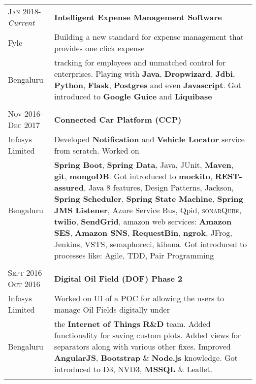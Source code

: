 \documentclass[a4paper,10pt]{article} %
\begin{document}
\begin{tabular}{l|p{11cm}}
\textsc{Jan 2018-}\emph{Current} & \textbf{Intelligent Expense Management Software}\\
Fyle & \footnotesize{Building a new standard for expense management that provides one click expense}\\
Bengaluru & \footnotesize{tracking for employees and unmatched control for enterprises. Playing with \textbf{Java}, \textbf{Dropwizard}, \textbf{Jdbi},  \textbf{Python}, \textbf{Flask}, \textbf{Postgres} and even \textbf{Javascript}.} Got introduced to \textbf{Google Guice} and \textbf{Liquibase}\\
\multicolumn{2}{c}{} \\

\textsc{Nov 2016-Dec 2017} & \textbf{Connected Car Platform (CCP)} \\
Infosys Limited & \footnotesize{Developed \textbf{Notification} and \textbf{Vehicle Locator} service from scratch. Worked on}\\ 
Bengaluru & \footnotesize{\textbf{Spring Boot}, \textbf{Spring Data}, Java, JUnit, \textbf{Maven}, \textbf{git}, \textbf{mongoDB}. Got introduced to \textbf{mockito}, \textbf{REST-assured}, Java 8 features, Design Patterns, Jackson, \textbf{Spring Scheduler}, \textbf{Spring State Machine}, \textbf{Spring JMS Listener}, Azure Service Bus, Qpid, \textsc{sonar}Q\textsc{ube}, \textbf{twilio}, \textbf{SendGrid}, amazon web services: \textbf{Amazon SES}, \textbf{Amazon SNS}, \textbf{RequestBin}, \textbf{ngrok}, JFrog, Jenkins, VSTS, semaphoreci, kibana. Got introduced to processes like: Agile, TDD, Pair Programming}\\
\multicolumn{2}{c}{} \\


\textsc{Sept 2016-Oct 2016} & \textbf{Digital Oil Field (DOF) Phase 2}\emph{}\\
Infosys Limited & \footnotesize{Worked on UI of a POC for allowing the users to manage Oil Fields digitally under}\\
Bengaluru & \footnotesize{the \textbf{Internet of Things} \textbf{R\&D} team. Added functionality for saving custom plots. Added views for separators along with various other fixes. Improved \textbf{AngularJS}, \textbf{Bootstrap} \& \textbf{Node.js} knowledge. Got introduced to D3, NVD3, \textbf{MSSQL} \& Leaflet.}\\
\multicolumn{2}{c}{} \\


\end{tabular}
\end{document}
